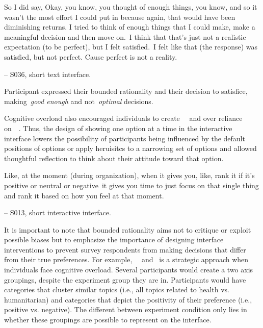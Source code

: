 \begin{displayquote}
So I did say, Okay, you know, you thought of enough things, you know, and so it wasn't the most effort I could put in because again, that would have been diminishing returns. I tried to think of enough things that I could make, make a meaningful decision and then move on.~\bracketellipsis I think that that's just not a realistic expectation (to be perfect), but I felt satisfied.~\bracketellipsis I felt like that (the response) was satisfied, but not perfect. Cause perfect is not a reality.

\noindent \hfill -- S036, short text interface.
\end{displayquote}

Participant expressed their bounded rationality and their decision to satisfice, making~\textit{good enough} and not~\textit{optimal} decisions.

Cognitive overload also encouraged individuals to create~\underline{}~\cite{tverskyJudgmentUncertaintyHeuristics1974} and over reliance on~\underline{}~\cite{thalerNudgeImprovingDecisions2008a}. Thus, the design of showing one option at a time in the interactive interface lowers the possibility of participants being influenced by the default positions of options or apply heruisitcs to a narrowing set of options and allowed thoughtful reflection to think about their attitude toward that option.

\begin{displayquote}
Like, at the moment (during organization), when it gives you, like, rank it if it's positive or neutral or negative~\bracketellipsis it gives you time to just focus on that single thing and rank it based on how you feel at that moment.
    
    \noindent \hfill -- S013, short interactive interface.
\end{displayquote}

It is important to note that bounded rationality aims not to critique or exploit possible biases but to emphasize the importance of designing interface interventions to prevent survey respondents from making decisions that differ from their true preferences. For example,~\underline{}~\cite{simonSciencesArtificial1996} and~\underline{} is a strategic approach when individuals face cognitive overload. Several participants would create a two axis groupings, despite the experiment group they are in. Participants would have categories that cluster similar topics (i.e., all topics related to health vs. humanitarian) and categories that depict the positivity of their preference (i.e., positive vs. negative). The different between experiment condition only lies in whether these groupings are possible to represent on the interface.


